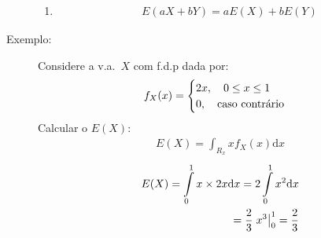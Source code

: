 \begin{description}
\begin{enumerate}[label=(\alph*)]
             \item 
             \begin{align}  E(aX + bY)=aE(X)+ b E(Y)\end{align}
           \end{enumerate}
         \item [Exemplo:]Considere a v.a.\ $X$ com f.d.p dada por: 
           \begin{align*}
             f_{X}(x)=\begin{cases}
               2x,\quad 0\le x \le 1 \\
               0, \text{\quad caso contrário}
             \end{cases}
           \end{align*}
           Calcular o $E(X)$:
           \begin{align*}
             E(X)=\int_{R_{x}} x f_{X}(x)\mathrm{d}x
           \end{align*}
           \begin{align*}
             E(X)=\int \limits_{0}^{1} x\times 2x\mathrm{d}x=2 \int \limits_{0}^{1} x^{2}\mathrm{d}x \\
             = \frac{2}{3} \left.x^{3}\right\rvert_{0}^{1} = \frac{2}{3}
           \end{align*}




\end{description}
